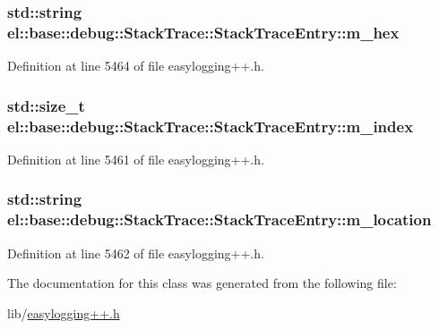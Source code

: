 \subsubsection[{m\+\_\+hex}]{\setlength{\rightskip}{0pt plus 5cm}std\+::string el\+::base\+::debug\+::\+Stack\+Trace\+::\+Stack\+Trace\+Entry\+::m\+\_\+hex}\label{classel_1_1base_1_1debug_1_1_stack_trace_1_1_stack_trace_entry_af4d5ffabfe8bbffb5eedcdd95b4eebfe}


Definition at line 5464 of file easylogging++.\+h.

\hypertarget{classel_1_1base_1_1debug_1_1_stack_trace_1_1_stack_trace_entry_a8361364e2cbb728a2e2a17db8b308842}{}
\subsubsection[{m\+\_\+index}]{\setlength{\rightskip}{0pt plus 5cm}std\+::size\+\_\+t el\+::base\+::debug\+::\+Stack\+Trace\+::\+Stack\+Trace\+Entry\+::m\+\_\+index}\label{classel_1_1base_1_1debug_1_1_stack_trace_1_1_stack_trace_entry_a8361364e2cbb728a2e2a17db8b308842}


Definition at line 5461 of file easylogging++.\+h.

\hypertarget{classel_1_1base_1_1debug_1_1_stack_trace_1_1_stack_trace_entry_aaf6f6c49736d5c10b2047dde6eef4a38}{}
\subsubsection[{m\+\_\+location}]{\setlength{\rightskip}{0pt plus 5cm}std\+::string el\+::base\+::debug\+::\+Stack\+Trace\+::\+Stack\+Trace\+Entry\+::m\+\_\+location}\label{classel_1_1base_1_1debug_1_1_stack_trace_1_1_stack_trace_entry_aaf6f6c49736d5c10b2047dde6eef4a38}


Definition at line 5462 of file easylogging++.\+h.



The documentation for this class was generated from the following file\+:\begin{DoxyCompactItemize}
\item 
lib/\hyperlink{easylogging_09_09_8h}{easylogging++.\+h}\end{DoxyCompactItemize}
